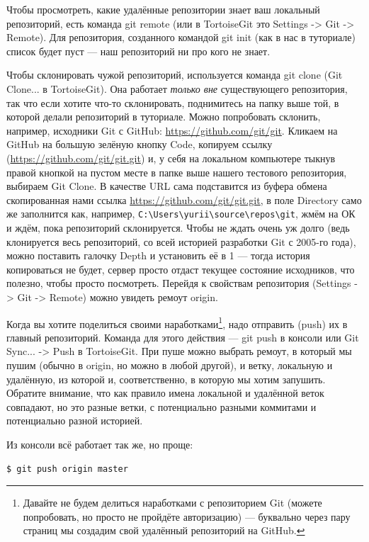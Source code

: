 \documentclass{../../text-style}
\begin{document}
Чтобы просмотреть, какие удалённые репозитории знает ваш локальный репозиторий, есть команда git remote (или в TortoiseGit это Settings -> Git -> Remote). Для репозитория, созданного командой git init (как в нас в туториале) список будет пуст --- наш репозиторий ни про кого не знает.

Чтобы склонировать чужой репозиторий, используется команда git clone (Git Clone... в TortoiseGit). Она работает \emph{только вне} существующего репозитория, так что если хотите что-то склонировать, поднимитесь на папку выше той, в которой делали репозиторий в туториале. Можно попробовать склонить, например, исходники Git с GitHub: \url{https://github.com/git/git}. Кликаем на GitHub на большую зелёную кнопку Code, копируем ссылку (\url{https://github.com/git/git.git}) и, у себя на локальном компьютере тыкнув правой кнопкой на пустом месте в папке выше нашего тестового репозитория, выбираем Git Clone. В качестве URL сама подставится из буфера обмена скопированная нами ссылка \url{https://github.com/git/git.git}, в поле Directory само же заполнится как, например, \verb|C:\Users\yurii\source\repos\git|, жмём на ОК и ждём, пока репозиторий склонируется. Чтобы не ждать очень уж долго (ведь клонируется весь репозиторий, со всей историей разработки Git с 2005-го года), можно поставить галочку Depth и установить её в 1 --- тогда история копироваться не будет, сервер просто отдаст текущее состояние исходников, что полезно, чтобы просто посмотреть. Перейдя к свойствам репозитория (Settings -> Git -> Remote) можно увидеть ремоут origin.

Когда вы хотите поделиться своими наработками\footnote{Давайте не будем делиться наработками с репозиторием Git (можете попробовать, но просто не пройдёте авторизацию) --- буквально через пару страниц мы создадим свой удалённый репозиторий на GitHub.}, надо отправить (push) их в главный репозиторий. Команда для этого действия --- git push в консоли или Git Sync... -> Push в TortoiseGit. При пуше можно выбрать ремоут, в который мы пушим (обычно в origin, но можно в любой другой), и ветку, локальную и удалённую, из которой и, соответственно, в которую мы хотим запушить. Обратите внимание, что как правило имена локальной и удалённой веток совпадают, но это разные ветки, с потенциально разными коммитами и потенциально разной историей.

Из консоли всё работает так же, но проще:

\begin{verbatim}
$ git push origin master
\end{verbatim}
\end{document}
